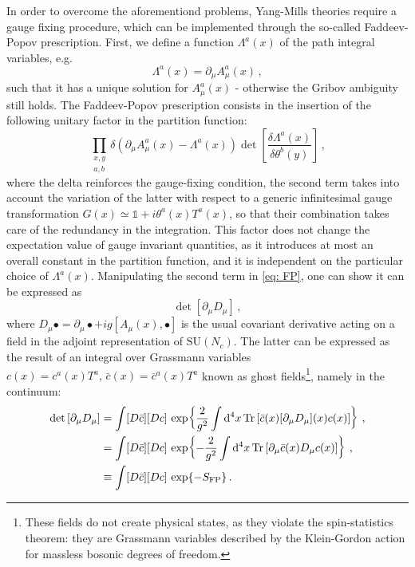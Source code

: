 \documentclass{article}
\begin{document}
In order to overcome the aforementiond problems, Yang-Mills theories require a gauge fixing procedure, which can be implemented through the so-called Faddeev-Popov prescription. First, we define a function $\Lambda^a(x)$ of the path integral variables, e.g.
\begin{equation}
    \Lambda^a(x) = \partial_{\mu} A_\mu^a(x) \, ,
\end{equation}
such that it has a unique solution for $A_\mu^a(x)$ - otherwise the Gribov ambiguity still holds.
The Faddeev-Popov prescription consists in the insertion of the following unitary factor in the partition function:
\begin{equation}\label{eq: FP}
    \prod_{\substack{x, y \\ a, b}} \delta(\partial_\mu A_\mu^a(x) - \Lambda^a(x)) \det \left[ \frac{\delta \Lambda^a(x)}{\delta \theta^b(y)} \right] \, ,
\end{equation}
where the delta reinforces the gauge-fixing condition, the second term takes into account the variation of the latter with respect to a generic infinitesimal gauge transformation $G(x) \simeq \mathbb{1} + i \theta^a(x)T^a(x)$, so that their combination takes care of the redundancy in the integration.
This factor does not change the expectation value of gauge invariant quantities, as it introduces at most an overall constant in the partition function, and it is independent on the particular choice of $\Lambda^a(x)$.
Manipulating the second term in \ref{eq: FP}, one can show it can be expressed as
\begin{equation}
    \det \left[ \partial_\mu D_\mu \right] \, ,
\end{equation}
where $D_\mu \bullet = \partial_\mu \bullet + ig\left[A_\mu(x), \bullet \right]$ is the usual covariant derivative acting on a field in the adjoint representation of $\mathrm{SU}(N_c)$. The latter can be expressed as the result of an integral over Grassmann variables $c(x) = c^a(x)T^a, \, \bar{c}(x) = \bar{c}^a(x)T^a$ known as ghost fields\footnote{These fields do not create physical states, as they violate the spin-statistics theorem: they are Grassmann variables described by the Klein-Gordon action for massless bosonic degrees of freedom.}, namely in the continuum:
\begin{align*}
    \det \left[ \partial_\mu D_\mu \right] &= \int [D\bar{c}] [Dc] \, \exp \! \left\{ \frac{2}{g^2} \int \dd[4]{x} \Tr \left[ \bar{c}(x) [\partial_\mu D_\mu](x) c(x) \right] \right\} \, , \\
   &= \int [D\bar{c}] [Dc] \, \exp \! \left\{ -\frac{2}{g^2} \int \dd[4]{x} \Tr \left[ \partial_\mu \bar{c}(x) D_\mu c(x) \right] \right\} \, , \\
   &\equiv \int [D\bar{c}] [Dc] \, \exp{-S_{\textrm{FP}}} \, .
\end{align*}
\end{document}
